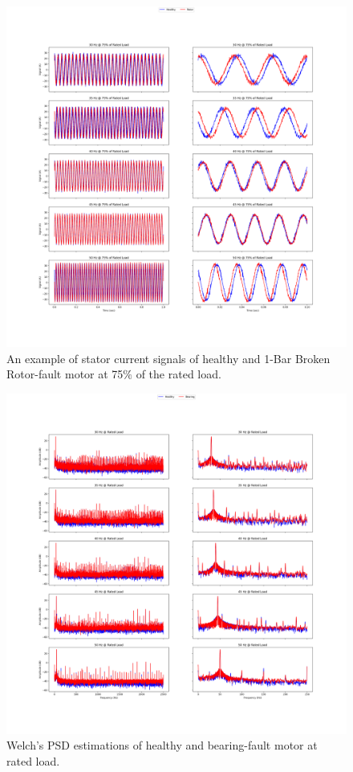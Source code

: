 \pagebreak
\begin{figure}[h]
	\centering
	\includegraphics[width=0.8\paperwidth,keepaspectratio=true]{./fig/rotor_75.png}
	\caption{An example of stator current signals of healthy and 1-Bar Broken Rotor-fault motor at 75$\%$ of the rated load.}	
	\label{rotor75}
\end{figure}
\pagebreak
\begin{figure}[h]
	\centering
	\includegraphics[width=0.8\paperwidth,keepaspectratio=true]{./fig/psdbearing_100.png}
	\caption{Welch's PSD estimations of healthy and bearing-fault motor at rated load.}	
	\label{psdbearing100}
\end{figure}
